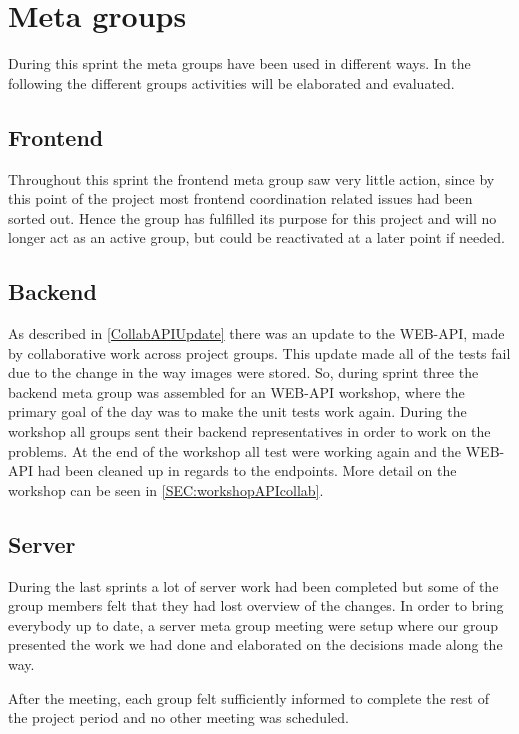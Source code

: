 \section{Meta groups}
During this sprint the meta groups have been used in different ways.
In the following the different groups activities will be elaborated and evaluated.

\subsection{Frontend}
Throughout this sprint the frontend meta group saw very little action, since by this point of the project most frontend coordination related issues had been sorted out.
Hence the group has fulfilled its purpose for this project and will no longer act as an active group, but could be reactivated at a later point if needed.

\subsection{Backend}
As described in \autoref{CollabAPIUpdate} there was an update to the WEB-API, made by collaborative work across project groups.
This update made all of the tests fail due to the change in the way images were stored.
So, during sprint three the backend meta group was assembled for an WEB-API workshop, where the primary goal of the day was to make the unit tests work again.
During the workshop all groups sent their backend representatives in order to work on the problems.
At the end of the workshop all test were working again and the WEB-API had been cleaned up in regards to the endpoints.
More detail on the workshop can be seen in \autoref{SEC:workshopAPIcollab}.

\subsection{Server}
During the last sprints a lot of server work had been completed but some of the group members felt that they had lost overview of the changes.
In order to bring everybody up to date, a server meta group meeting were setup where our group presented the work we had done and elaborated on the decisions made along the way.

After the meeting, each group felt sufficiently informed to complete the rest of the project period and no other meeting was scheduled.
